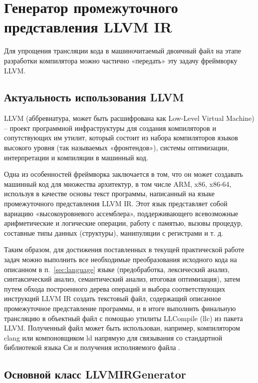 \newpage
\section{Генератор промежуточного представления LLVM IR}
\label{sec:llvmir_codegen}

Для упрощения трансляции кода в машиночитаемый двоичный файл на этапе разработки компилятора можно частично «передать» эту задачу фреймворку LLVM.

\subsection{Актуальность использования LLVM}

LLVM (аббревиатура, может быть расшифрована как Low-Level Virtual Machine) -- проект программной инфраструктуры для создания компиляторов и сопутствующих им утилит, который состоит из набора компиляторов языков высокого уровня (так называемых «фронтендов»), системы оптимизации, интерпретации и компиляции в машинный код.

Одна из особенностей фреймворка заключается в том, что он может создавать машинный код для множества архитектур, в том числе ARM, x86, x86-64, используя в качестве основы текст программы, написанный на языке промежуточного представления LLVM IR.
Этот язык представляет собой вариацию «высокоуровневого ассемблера», поддерживающего всевозможные арифметические и логические операции, работу с памятью, вызовы процедур, составные типы данных (структуры), манипуляции с регистрами и т. д.

Таким образом, для достижения поставленных в текущей практической работе задач можно выполнить все необходимые преобразования исходного кода на описанном в п.~\ref{sec:language} языке (предобработка, лексический анализ, синтаксический анализ, семантический анализ, итоговая оптимизация), затем путем обхода построенного дерева операций и выбора соответствующих инструкций LLVM IR создать текстовый файл, содержащий описанное промежуточное представление программы, и в итоге выполнить финальную трансляцию в объектный файл с помощью утилиты LLCompile (llc) из пакета LLVM.
Полученный файл может быть использован, например, компилятором clang или компоновщиком ld напрямую для связывания со стандартной библиотекой языка Си и получения исполняемого файла \cite{llvm_docs}.

\subsection{Основной класс LLVMIRGenerator}

